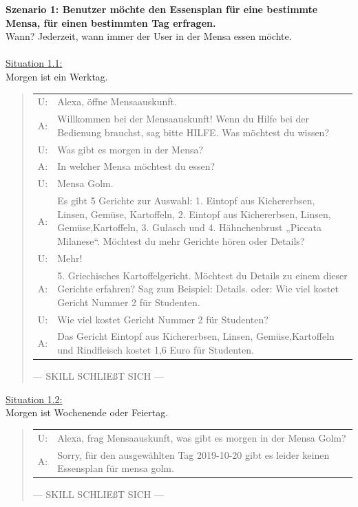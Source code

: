\documentclass[12pt]{article}
\begin{document}
\textbf{Szenario 1: Benutzer möchte den Essensplan für eine bestimmte Mensa, für einen bestimmten Tag erfragen.}\\
Wann? Jederzeit, wann immer der User in der Mensa essen möchte.\\~\\
\ul{Situation 1.1:}\\Morgen ist ein Werktag.\\
\begin{quote}
\begin{tabular}{lp{12cm}}
	U:& Alexa, öffne Mensaauskunft.\\
	A:& Willkommen bei der Mensaauskunft! Wenn du Hilfe bei der Bedienung brauchst, sag bitte HILFE. Was möchtest du wissen?\\
	U:& Was gibt es morgen in der Mensa?\\  
	A:& In welcher Mensa möchtest du essen?\\
	U:& Mensa Golm.\\
	A:& Es gibt 5  Gerichte  zur Auswahl: 1. Eintopf aus Kichererbsen, Linsen, Gemüse, Kartoffeln, 2. Eintopf aus Kichererbsen, Linsen, Gemüse,Kartoffeln, 3. Gulasch und 4. Hähnchenbrust „Piccata Milanese“. Möchtest du mehr Gerichte hören oder Details?\\ 
	U:& Mehr!\\ 
	A:& 5. Griechisches Kartoffelgericht. Möchtest du Details zu einem dieser Gerichte erfahren? Sag zum Beispiel: Details. oder: Wie viel kostet Gericht Nummer 2 für Studenten.\\
	U:& Wie viel kostet Gericht Nummer 2 für Studenten?\\
	A:& Das Gericht Eintopf aus Kichererbsen, Linsen, Gemüse,Kartoffeln und Rindfleisch kostet 1,6 Euro für Studenten.\\[0.2cm]
\end{tabular}
--- SKILL SCHLIEßT SICH ---\\
\end{quote}

\ul{Situation 1.2:}\\Morgen ist Wochenende oder Feiertag.
\begin{quote}
\begin{tabular}{lp{12cm}}
	U:& Alexa, frag Mensaauskunft, was gibt es morgen in der Mensa Golm?\\  
	A:& Sorry, für den ausgewählten Tag 2019-10-20 gibt es leider keinen Essensplan für mensa golm.\\[0.2cm]  
\end{tabular}
--- SKILL SCHLIEßT SICH ---\\
\end{quote}
\end{document}
